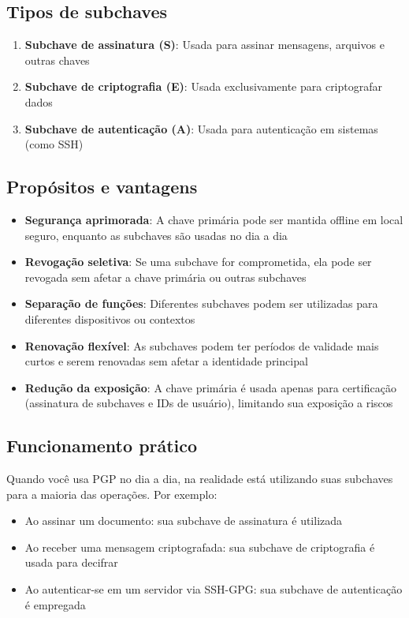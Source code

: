 \subsection{Tipos de subchaves}
\begin{enumerate}
    \item \textbf{Subchave de assinatura (S)}: Usada para assinar mensagens, arquivos e outras chaves
    \item \textbf{Subchave de criptografia (E)}: Usada exclusivamente para criptografar dados
    \item \textbf{Subchave de autenticação (A)}: Usada para autenticação em sistemas (como SSH)
\end{enumerate}

\subsection{Propósitos e vantagens}
\begin{itemize}
    \item \textbf{Segurança aprimorada}: A chave primária pode ser mantida offline em local seguro, enquanto as subchaves são usadas no dia a dia
    \item \textbf{Revogação seletiva}: Se uma subchave for comprometida, ela pode ser revogada sem afetar a chave primária ou outras subchaves
    \item \textbf{Separação de funções}: Diferentes subchaves podem ser utilizadas para diferentes dispositivos ou contextos
    \item \textbf{Renovação flexível}: As subchaves podem ter períodos de validade mais curtos e serem renovadas sem afetar a identidade principal
    \item \textbf{Redução da exposição}: A chave primária é usada apenas para certificação (assinatura de subchaves e IDs de usuário), limitando sua exposição a riscos
\end{itemize}

\subsection{Funcionamento prático}
Quando você usa PGP no dia a dia, na realidade está utilizando suas subchaves para a maioria das operações. Por exemplo:
\begin{itemize}
    \item Ao assinar um documento: sua subchave de assinatura é utilizada
    \item Ao receber uma mensagem criptografada: sua subchave de criptografia é usada para decifrar
    \item Ao autenticar-se em um servidor via SSH-GPG: sua subchave de autenticação é empregada
\end{itemize}

